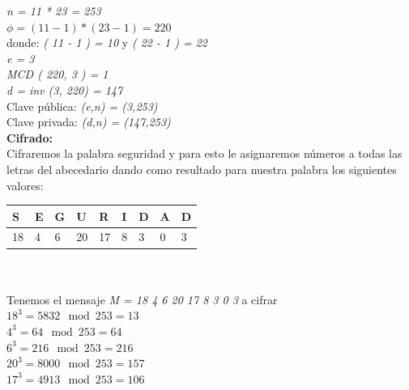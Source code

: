 \textit{n = 11 * 23 = 253} \\ 

\textit{$ \phi = ( 11 - 1 ) * ( 23 - 1 ) = 220 $}\\

donde: \textit{( 11 - 1 ) = 10}   y   \textit{( 22 - 1 ) = 22 }\\

\textit{e = 3} \\

\textit{MCD ( 220, 3 ) = 1} \\

\textit{d = inv (3, 220) = 147 } \\


Clave pública:    \textit{ (e,n) = (3,253) } \\

Clave privada:   \textit { (d,n) = (147,253) } \\

\textbf{ Cifrado: }\\

Cifraremos la palabra seguridad y para esto le asignaremos números a todas las letras del abecedario dando como resultado para nuestra palabra los siguientes valores: \\

\begin{tabular}{ |p{1cm}|p{1cm}|p{1cm}|p{1cm}|p{1cm}|p{1cm}|p{1cm}|p{1cm}|p{1cm}| }
\hline
{ S } & { E } & { G } & { U } & { R } & { I } & { D } & { A } & { D } \\
\hline
{ 18 } & { 4 } & { 6 } & { 20 } & { 17 } & { 8 } & { 3 } & { 0 } & { 3 } \\
\hline
\end{tabular}
\\ \\

Tenemos el mensaje \textit{ M = 18 4 6 20 17 8 3 0 3 } a cifrar\\

\textit{$ 18^{3} = 5832 \mod 253 = 13$} \\

\textit{$ 4^{3} = 64 \mod 253 = 64$} \\

\textit{$ 6^{3} = 216 \mod 253 = 216 $} \\ 

\textit{$ 20^{3} = 8000 \mod 253 = 157 $} \\

\textit{$ 17^{3} = 4913 \mod 253 = 106 $}\\

